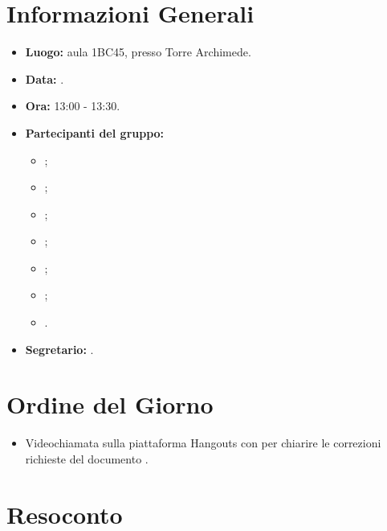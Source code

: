 \section{Informazioni Generali}
\begin{itemize}
\item \textbf{Luogo:} aula 1BC45, presso Torre Archimede.
\item \textbf{Data:} \Data.
\item \textbf{Ora:} 13:00 - 13:30.
\item \textbf{Partecipanti del gruppo:}
\begin{itemize}
	\item \AT{}; 
	\item \CE{}; 
	\item \DF{};
	\item \LD{};
	\item \MC{};
	\item \PF{};
	\item \SE{}.
\end{itemize} 
\item \textbf{Segretario:} \SE{}.
\end{itemize}

\section{Ordine del Giorno}
\begin{itemize}
	\item Videochiamata sulla piattaforma Hangouts con \CR{} per chiarire le correzioni richieste del documento .
\end{itemize}


\section{Resoconto}
